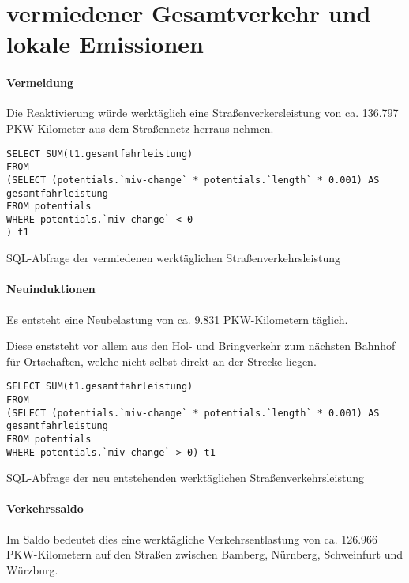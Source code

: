 \documentclass[fontsize=12pt,a4paper]{scrreprt}
\begin{document}
        \section{vermiedener Gesamtverkehr und lokale Emissionen}


                \paragraph{Vermeidung}
Die Reaktivierung würde werktäglich eine Straßenverkersleistung von ca. 136.797 PKW-Kilometer aus dem Straßennetz herraus nehmen.

\begin{listing}[htbp]
\begin{verbatim}
SELECT SUM(t1.gesamtfahrleistung)  
FROM
(SELECT (potentials.`miv-change` * potentials.`length` * 0.001) AS gesamtfahrleistung
FROM potentials
WHERE potentials.`miv-change` < 0
) t1
\end{verbatim}
\caption{SQL-Abfrage der vermiedenen werktäglichen Straßenverkehrsleistung}\label{lst-verm-werktaeglich}
\end{listing}

\paragraph{Neuinduktionen}
Es entsteht eine Neubelastung von ca. 9.831 PKW-Kilometern täglich.

Diese enststeht vor allem aus den Hol- und Bringverkehr zum nächsten Bahnhof für Ortschaften, welche nicht selbst direkt an der Strecke liegen.

\begin{listing}[htbp]
\begin{verbatim}
SELECT SUM(t1.gesamtfahrleistung)  
FROM
(SELECT (potentials.`miv-change` * potentials.`length` * 0.001) AS gesamtfahrleistung
FROM potentials
WHERE potentials.`miv-change` > 0) t1
\end{verbatim}
\caption{SQL-Abfrage der neu entstehenden werktäglichen Straßenverkehrsleistung}\label{lst-neu-werktaeglich}
\end{listing}

\paragraph{Verkehrssaldo}

Im Saldo bedeutet dies eine werktägliche Verkehrsentlastung von ca. 126.966 PKW-Kilometern auf den Straßen zwischen Bamberg, Nürnberg, Schweinfurt und Würzburg.
\end{document}
